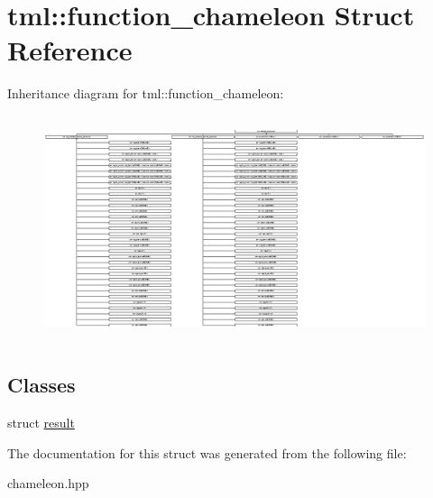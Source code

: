 \hypertarget{structtml_1_1function__chameleon}{\section{tml\+:\+:function\+\_\+chameleon Struct Reference}
\label{structtml_1_1function__chameleon}
}
Inheritance diagram for tml\+:\+:function\+\_\+chameleon\+:\begin{figure}[H]
\begin{center}
\leavevmode
\includegraphics[height=6.626099cm]{structtml_1_1function__chameleon}
\end{center}
\end{figure}
\subsection*{Classes}
\begin{DoxyCompactItemize}
\item 
struct \hyperlink{structtml_1_1function__chameleon_1_1result}{result}
\end{DoxyCompactItemize}


The documentation for this struct was generated from the following file\+:\begin{DoxyCompactItemize}
\item 
chameleon.\+hpp\end{DoxyCompactItemize}
